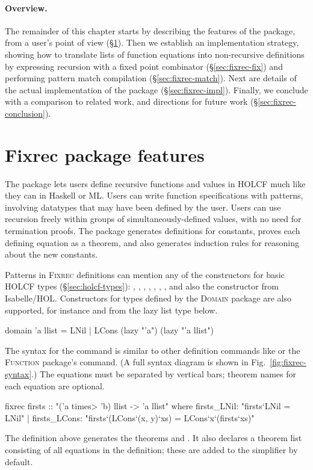 \paragraph{Overview.} The remainder of this chapter starts by describing the features of the {\fixrec} package, from a user's point of view (\S\ref{sec:fixrec-features}). Then we establish an implementation strategy, showing how to translate lists of function equations into non-recursive definitions by expressing recursion with a fixed point combinator (\S\ref{sec:fixrec-fix}) and performing pattern match compilation (\S\ref{sec:fixrec-match}). Next are details of the actual implementation of the {\fixrec} package (\S\ref{sec:fixrec-impl}). Finally, we conclude with a comparison to related work, and directions for future work (\S\ref{sec:fixrec-conclusion}).

\section{Fixrec package features}
\label{sec:fixrec-features}

The {\fixrec} package lets users define recursive functions and values in HOLCF much like they can in Haskell or ML. Users can write function specifications with patterns, involving datatypes that may have been defined by the user. Users can use recursion freely within groups of simultaneously-defined values, with no need for termination proofs. The {\fixrec} package generates definitions for constants, proves each defining equation as a theorem, and also generates induction rules for reasoning about the new constants.

Patterns in \textsc{Fixrec} definitions can mention any of the constructors for basic HOLCF types (\S\ref{sec:holcf-types}): , , , , , , , and also the  constructor \isa{(_, _)} from Isabelle/HOL. Constructors for types defined by the \textsc{Domain} package are also supported, for instance  and  from the lazy list type below.
%
\begin{isacode}
domain 'a llist = LNil | LCons (lazy "'a") (lazy "'a llist")
\end{isacode}

The syntax for the  command is similar to other definition commands like  or the \textsc{Function} package's  command. (A full syntax diagram is shown in Fig.~\ref{fig:fixrec-syntax}.) The equations must be separated by vertical bars; theorem names for each equation are optional.
%
\begin{isacode}
fixrec firsts :: "('a \<times> 'b) llist -> 'a llist"
  where firsts_LNil: "firsts`LNil = LNil"
  | firsts_LCons: "firsts`(LCons`(x, y)`xs) = LCons`x`(firsts`xs)"
\end{isacode}
%
The definition above generates the theorems  and . It also declares a theorem list  consisting of all equations in the definition; these are added to the simplifier by default.

